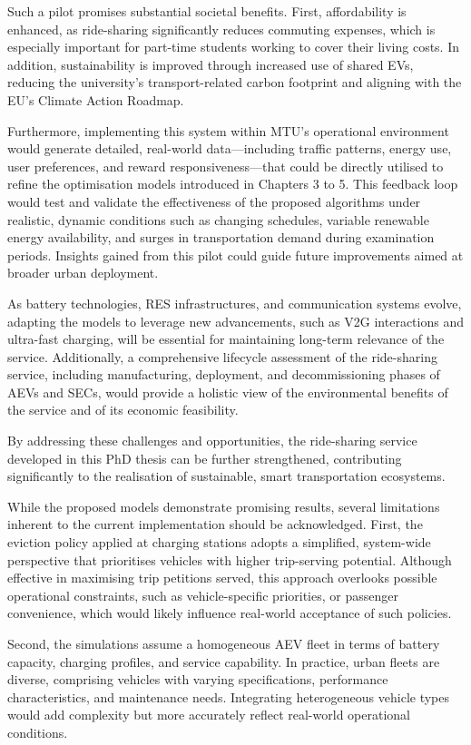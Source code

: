 Such a pilot promises substantial societal benefits. First, affordability is enhanced, as ride-sharing significantly reduces commuting expenses, which is especially important for part-time students working to cover their living costs. In addition, sustainability is improved through increased use of shared EVs, reducing the university’s transport-related carbon footprint and aligning with the EU’s Climate Action Roadmap.

Furthermore, implementing this system within MTU's operational environment would generate detailed, real-world data—including traffic patterns, energy use, user preferences, and reward responsiveness—that could be directly utilised to refine the optimisation models introduced in Chapters 3 to 5. This feedback loop would test and validate the effectiveness of the proposed algorithms under realistic, dynamic conditions such as changing schedules, variable renewable energy availability, and surges in transportation demand during examination periods. Insights gained from this pilot could guide future improvements aimed at broader urban deployment.

As battery technologies, RES infrastructures, and communication systems evolve, adapting the models to leverage new advancements, such as V2G interactions and ultra-fast charging, will be essential for maintaining long-term relevance of the service. Additionally, a comprehensive lifecycle assessment of the ride-sharing service, including manufacturing, deployment, and decommissioning phases of AEVs and SECs, would provide a holistic view of the environmental benefits of the service and of its economic feasibility. 

By addressing these challenges and opportunities, the ride-sharing service developed in this PhD thesis can be further strengthened, contributing significantly to the realisation of sustainable, smart transportation ecosystems.

While the proposed models demonstrate promising results, several limitations inherent to the current implementation should be acknowledged. First, the eviction policy applied at charging stations adopts a simplified, system-wide perspective that prioritises vehicles with higher trip-serving potential. Although effective in maximising trip petitions served, this approach overlooks possible operational constraints, such as vehicle-specific priorities, or passenger convenience, which would likely influence real-world acceptance of such policies.

Second, the simulations assume a homogeneous AEV fleet in terms of battery capacity, charging profiles, and service capability. In practice, urban fleets are diverse, comprising vehicles with varying specifications, performance characteristics, and maintenance needs. Integrating heterogeneous vehicle types would add complexity but more accurately reflect real-world operational conditions.


